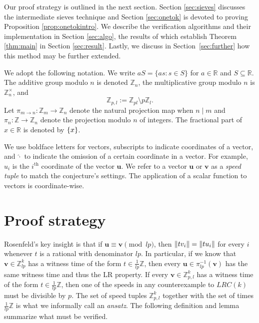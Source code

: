 \documentclass[11pt]{amsart}
\DeclarePairedDelimiter\norm{\lVert}{\rVert}
\DeclarePairedDelimiter\fracpart{\{}{\}}
\newcommand{\Unit}[1]{\Z_{#1}^\times}
\newcommand{\R}{\mathbb{R}}
\newcommand{\Z}{\mathbb{Z}}
\newcommand{\vbf}{\mathbf{v}}
\newcommand{\ubf}{\mathbf{u}}
\theoremstyle{definition}
\theoremstyle{remark}
\begin{document}
Our proof strategy is outlined in the next section. Section \ref{sec:sieves} discusses the intermediate sieves 
technique and Section \ref{sec:onetok} is devoted to proving Proposition \ref{prop:onetokintro}. 
We describe the verification algorithms and their implementation in Section \ref{sec:algo}, 
the results of which establish Theorem \ref{thm:main} in Section \ref{sec:result}.
Lastly, we discuss in Section~\ref{sec:further} how this method may be further extended.

We adopt the following notation. We write $aS=\{as:s\in S\}$ for $a\in\R$ and $S\subseteq\R$. 
The additive group modulo $n$ is denoted $\Z_{n}$, the multiplicative group modulo $n$ is $\Unit{n}$, and 
\[\Z_{p, l}:=\Z_{pl}\setminus p\Z_{l}.\]
Let $\pi_{m \to n}:\Z_{m} \to \Z_{n}$ denote the natural projection map when $n\mid m$
and $\pi_n: \Z \to \Z_{n}$ denote the projection modulo $n$ of integers.
The fractional part of $x\in\R$ is denoted by $\fracpart{x}$.

We use boldface letters for vectors, subscripts to indicate coordinates of a vector, 
and $\widehat{\cdot}$ to indicate the omission of a certain coordinate in a vector. 
For example, $u_i$ is the $i^\text{th}$ coordinate of the vector $\ubf$.
We refer to a vector $\ubf$ or $\vbf$ as a \emph{speed tuple} to match the conjecture's settings. 
The application of a scalar function to vectors is coordinate-wise. 

\section{Proof strategy}

Rosenfeld's \cite{Rosenfeld} key insight is that if $\ubf\equiv\vbf\pmod{lp}$, 
then $\norm{tv_i}=\norm{tu_i}$ for every $i$ whenever $t$ is a rational with denominator $lp$. 
In particular, if we know that $\vbf\in\Z_{lp}^k$ has a witness time of the form $t\in\frac{1}{lp}\Z$,
then every $\ubf\in\pi^{-1}_{lp}(\vbf)$ has the same witness time and thus the LR property.
If every $\vbf\in\Z_{p,l}^k$ has a witness time of the form $t\in\frac{1}{lp}\Z$,
then one of the speeds in any counterexample to $LRC(k)$ must be divisible by $p$. The set of speed tuples $\Z_{p,l}^k$ together with the set of times $\frac{1}{lp}\Z$ is what we informally call an \emph{ansatz}.
The following definition and lemma summarize what must be verified.
\end{document}
